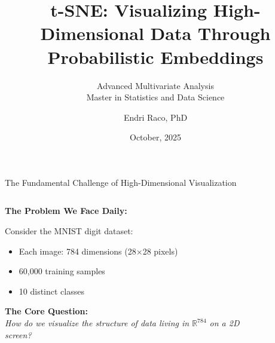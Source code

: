 \documentclass[10pt]{beamer}
\title{t-SNE: Visualizing High-Dimensional Data Through Probabilistic Embeddings}
\subtitle{Advanced Multivariate Analysis\\Master in Statistics and Data Science}
\author{Endri Raco, PhD}
\institute{Universitat Politècnica de Catalunya}
\date{October, 2025}
\begin{document}
\begin{frame}
\titlepage
\end{frame}

\begin{frame}{The Fundamental Challenge of High-Dimensional Visualization}

\begin{columns}
\begin{column}{0.5\textwidth}
\textbf{The Problem We Face Daily:}
\vspace{0.3cm}

Consider the MNIST digit dataset:
\begin{itemize}
    \item Each image: 784 dimensions (28×28 pixels)
    \item 60,000 training samples
    \item 10 distinct classes
\end{itemize}

\vspace{0.5cm}
\textbf{The Core Question:}\\
\emph{How do we visualize the structure of data living in $\mathbb{R}^{784}$ on a 2D screen?}

\end{column}
\begin{column}{0.5\textwidth}
\begin{figure}
\centering
{}
\end{figure}
\end{column}
\end{columns}
\end{frame}
\end{document}
